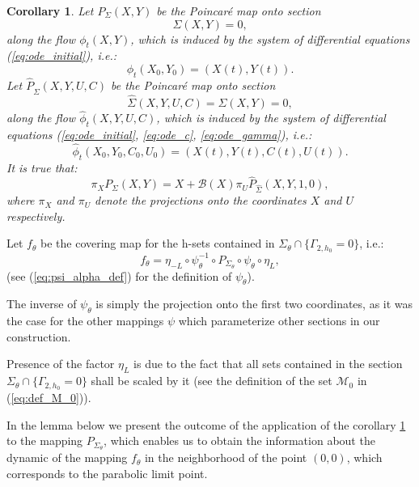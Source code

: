 \documentclass[1p]{article}
\newtheorem{corollary}{Corollary}
\begin{document}
\begin{corollary}
    \label{col:exp_trick_Poincare}
    Let $P_\Sigma (X,Y)$ be the Poincar\'e map onto section
    \[
        \Sigma (X,Y) = 0,
    \]
    along the flow $\phi_t (X,Y)$, which is induced by the system of differential equations (\ref{eq:ode_initial}), i.e.:
    \[
        \phi_t (X_0, Y_0) = \left( X(t), Y(t) \right).
    \]
    Let $\hat{P}_{\hat{\Sigma}} (X,Y,U,C)$ be the Poincar\'e map onto section
    \[
        \hat{\Sigma} (X,Y,U,C) = \Sigma(X,Y) = 0,
    \]
    along the flow $\hat{\phi}_t (X,Y,U,C)$, which is induced by the system of differential equations (\ref{eq:ode_initial}, \ref{eq:ode_c}, \ref{eq:ode_gamma}), i.e.:
    \[
        \hat{\phi}_t (X_0, Y_0, C_0, U_0) = \left( X(t), Y(t), C(t), U(t) \right).
    \]
    It is true that:
    \begin{equation}
        \label{eq:poincare_from_poincare}
        \pi_X P_\Sigma (X, Y) = X + \mathcal{B}(X) \pi_U \hat{P}_{\hat{\Sigma}} (X, Y, 1, 0),
    \end{equation}
    where $\pi_X$ and $\pi_U$ denote the projections onto the coordinates $X$ and $U$ respectively.
\end{corollary}

Let $f_\theta$ be the covering map for the h-sets contained in $\Sigma_\theta \cap \{ \Gamma_{2,h_0} = 0\}$, i.e.:
\begin{equation}
    f_\theta = \eta_{-L} \circ \psi_\theta^{-1} \circ P_{\Sigma_\theta} \circ \psi_\theta \circ \eta_{L},
\end{equation}
(see (\ref{eq:psi_alpha_def}) for the definition of $\psi_\theta$).

The inverse of $\psi_\theta$ is simply the projection onto the first two coordinates, as it was the case for the other mappings $\psi$ which parameterize other sections in our construction.

Presence of the factor $\eta_{L}$ is due to the fact that all sets contained in the section $\Sigma_\theta \cap \{ \Gamma_{2,h_0} = 0\}$ shall be scaled by it (see the definition of the set $\mathcal{M}_0$ in (\ref{eq:def_M_0})).

In the lemma below we present the outcome of the application of the corollary \ref{col:exp_trick_Poincare} to the mapping $P_{\Sigma_\theta}$, which enables us to obtain the information about the dynamic of the mapping $f_\theta$ in the neighborhood of the point $(0,0)$, which corresponds to the parabolic limit point.
\end{document}
